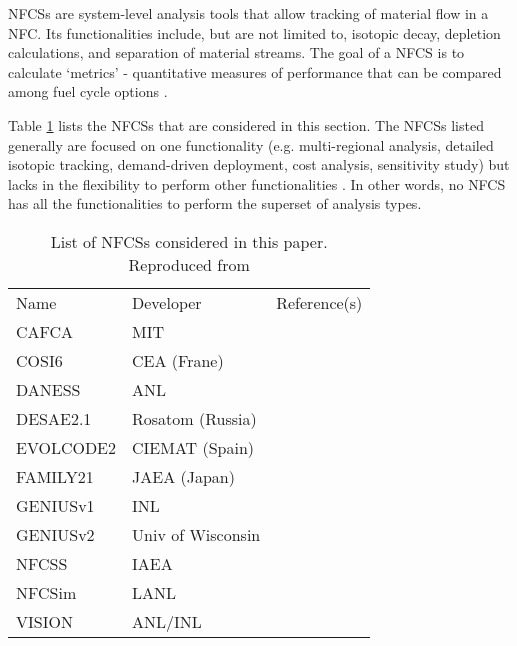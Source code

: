 \glspl{NFCS} are system-level analysis tools
that allow tracking of material flow in a \gls{NFC}. Its
functionalities include, but are not limited to, isotopic decay,
depletion calculations, and separation of material streams.
The goal of a \gls{NFCS} is to calculate `metrics' - quantitative
measures of performance that can be compared among fuel cycle
options \cite{huff_fundamental_2016}.

Table \ref{tab:fcs} lists the \glspl{NFCS}
that are considered in this section. The \glspl{NFCS}
listed generally are focused on one functionality
(e.g. multi-regional analysis, detailed isotopic tracking,
demand-driven deployment, cost analysis, sensitivity study)
but lacks in the flexibility to perform other
functionalities \cite{huff_next_2010}. In
other words, no \gls{NFCS} has all the functionalities to
perform the superset of analysis types.

\begin{table}[h]
    \centering
    \caption{List of \glspl{NFCS} considered in this paper.
             Reproduced from \cite{huff_next_2010}}
    \label{tab:fcs}
    \begin{tabular}{lll}
        \hline
        Name & Developer & Reference(s) \\
        CAFCA & MIT & \cite{guerin_benchmark_2009}\\
        COSI6 & CEA (Frane) & \cite{meyer_new_2009} \\
        DANESS & ANL & \cite{van_daness:_2006}\\
        DESAE2.1 & Rosatom (Russia) & \cite{tsibulskiy_desae_2006}\\
        EVOLCODE2 & CIEMAT (Spain) & \cite{alvaerz-velarde_validation_2014}\\
        FAMILY21 & JAEA (Japan) & \cite{oecd_nuclear_2009}\\
        GENIUSv1 & INL & \cite{dunzik-gougar_global_2007}\\
        GENIUSv2 & Univ of Wisconsin & \cite{dunn_genius_2009}\\
        NFCSS & IAEA & \cite{iaea_guidance_2008}\\
        NFCSim & LANL & \cite{schneider_nfcsim:_2005} \\
        VISION & ANL/INL & \cite{jacobson_verifiable_2010} \\
        \hline
    \end{tabular}
\end{table}


